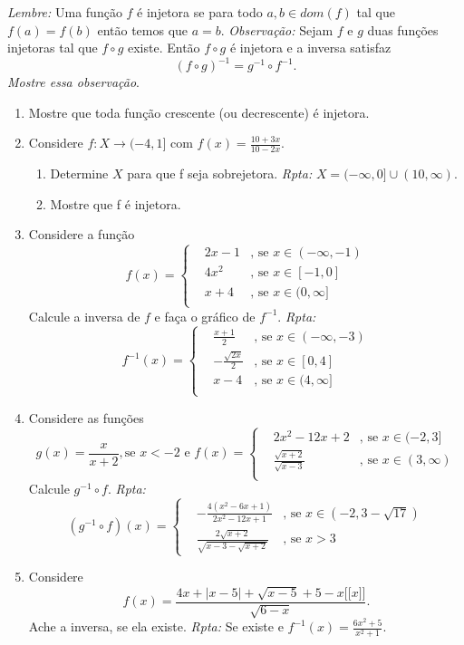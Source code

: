 \documentclass[latin,20pt]{article}
\begin{document}
 {\it Lembre: } Uma função $f$ é injetora se para todo $a, b \in dom(f)$ tal que $f(a)=f(b)$ então temos que $a=b$. \newline 
 {\it Observação: } Sejam $f$ e $g$ duas funções injetoras tal que
 $f \circ g$ existe. Então  $f \circ g$ é injetora e a inversa satisfaz 
  $$(f \circ g)^{-1}= g^{-1} \circ f^{-1}.$$ 
  {\it Mostre essa observação}.        
    \begin{enumerate}
    \item Mostre que toda função crescente (ou decrescente) é injetora. 
    \item Considere $f: X\rightarrow (-4,1]$ com $f(x)=\frac{10+3x}{10-2x}$. 
      \begin{enumerate}
      \item Determine $X$ para que f seja sobrejetora. {\it Rpta: } 
      $X=(-\infty,0]\cup (10,\infty)$.
      \item Mostre que f é injetora. 
      \end{enumerate} 
    \item Considere a função    
    $$
    f(x)= \left\{  
            \begin{array}{lll}
    &2x-1 &\text{, se } x \in (-\infty, -1) \\
    &4x^2 &\text{, se } x \in [-1,0] \\
    &x+4  &\text{, se } x \in (0,\infty] \\
            \end{array}
            \right. 
    $$
    Calcule a inversa de $f$ e faça o gráfico de $f^{-1}$. {\it Rpta: }
     $$
    f^{-1}(x)= \left\{  
            \begin{array}{lll}
    &\frac{x+1}{2} &\text{, se } x \in (-\infty, -3) \\
    &-\frac{\sqrt{2x}}{2} &\text{, se } x \in [0,4] \\
    & x-4  &\text{, se } x \in (4,\infty] \\
            \end{array}
            \right. 
    $$
    \item Considere as funções    
    $$
    g(x)= \frac{x}{x+2}, \text{se } x<-2    
    \text{ e }
    f(x)= \left\{  
            \begin{array}{lll}
    &2x^2-12x+2 &\text{, se } x \in (-2, 3] \\
    &\frac{\sqrt{x+2}}{\sqrt{x-3}} &\text{, se } x \in (3,\infty) \\
            \end{array}
            \right.
    $$
    Calcule $g^{-1}\circ f$. {\it Rpta: }
     $$
    (g^{-1}\circ f)(x)= \left\{  
            \begin{array}{lll}
    &-\frac{4(x^2-6x+1)}{2x^2-12x+1} &\text{, se } x \in (-2, 3-\sqrt{17}) \\
    &\frac{2\sqrt{x+2}}{\sqrt{x-3-\sqrt{x+2}}} &\text{, se } x >3
            \end{array}
            \right. 
    $$
    \item Considere 
    $$f(x)=\frac{4x+|x-5|+\sqrt{x-5}+5-x\lbrack\!\lbrack x \rbrack\!\rbrack}{\sqrt{6-x}}.$$
    Ache a inversa, se ela existe. {\it Rpta:}  Se existe e 
    $f^{-1}(x)=\frac{6x^2+5}{x^2+1}$.
    \end{enumerate}         
\end{document}
